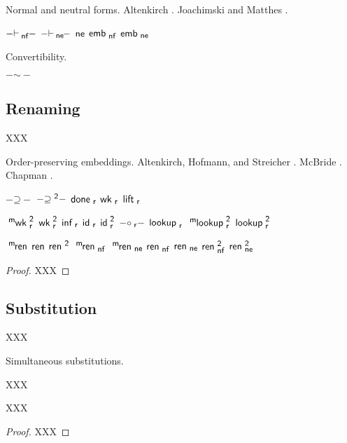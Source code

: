 \documentclass{entcs}
\renewcommand{\:}{\mathrel{:}}
\renewcommand{\;}{\mathbin{;}}
\newcommand{\binop}[1]{-\mathord{#1}-}
\newcommand{\tsf}[1]{\textsf{\upshape{#1}}}
\newcommand{\stsf}[1]{\tsf{\small{#1}}}
\newcommand{\enf}{\mathrel{\vdash_{\mkern-2mu\stsf{nf}}}}
\newcommand{\ene}{\mathrel{\vdash_{\mkern-2mu\rlap{$\stsf{ne}$}\hphantom{\stsf{nf}}}}}
\renewcommand{\ne}{\operatorname{\tsf{ne}}}
\newcommand{\embnf}{\operatorname{\tsf{emb}_{\stsf{nf}}}}
\newcommand{\embne}{\operatorname{\tsf{emb}_{\stsf{ne}}}}
\newcommand{\conv}{\mathrel{\sim}}
\renewcommand{\geq}{\mathrel{\supseteq}}
\newcommand{\geqZ}{\mathrel{\supseteq^{\stsf{2}}}}
\newcommand{\doner}{\operatorname{\tsf{done}_{\stsf{r}}}}
\newcommand{\wkr}{\operatorname{\tsf{wk}_{\stsf{r}}}}
\newcommand{\liftr}{\operatorname{\tsf{lift}_{\stsf{r}}}}
\newcommand{\mwkrZ}{\operatorname{^{\stsf{m}\mkern-1mu}\tsf{wk}_{\stsf{r}}^{\stsf{2}}}}
\newcommand{\wkrZ}{\operatorname{\tsf{wk}_{\stsf{r}}^{\stsf{2}}}}
\newcommand{\infr}{\operatorname{\tsf{inf}_{\stsf{r}}}}
\newcommand{\idr}{\operatorname{\tsf{id}_{\stsf{r}}}}
\newcommand{\idrZ}{\operatorname{\tsf{id}_{\stsf{r}}^{\stsf{2}}}}
\newcommand{\compr}{\mathrel{\circ_{\mkern-1mu\stsf{r}}}}
\newcommand{\lookupr}{\operatorname{\tsf{lookup}_{\stsf{r}}}}
\newcommand{\mlookuprZ}{\operatorname{^{\stsf{m}\mkern-1mu}\tsf{lookup}_{\stsf{r}}^{\stsf{2}}}}
\newcommand{\lookuprZ}{\operatorname{\tsf{lookup}_{\stsf{r}}^{\stsf{2}}}}
\newcommand{\mren}{\operatorname{^{\stsf{m}\mkern-2mu}\tsf{ren}}}
\newcommand{\ren}{\operatorname{\tsf{ren}}}
\newcommand{\renZ}{\operatorname{\tsf{ren}^{\stsf{2}}}}
\newcommand{\mrennf}{\operatorname{^{\stsf{m}\mkern-2mu}\tsf{ren}_{\stsf{nf}}}}
\newcommand{\mrenne}{\operatorname{^{\stsf{m}\mkern-2mu}\tsf{ren}_{\stsf{ne}}}}
\newcommand{\rennf}{\operatorname{\tsf{ren}_{\stsf{nf}}}}
\newcommand{\renne}{\operatorname{\tsf{ren}_{\stsf{ne}}}}
\newcommand{\rennfZ}{\operatorname{\tsf{ren}_{\stsf{nf}}^{\stsf{2}}}}
\newcommand{\renneZ}{\operatorname{\tsf{ren}_{\stsf{ne}}^{\stsf{2}}}}
\begin{document}
\begin{definition}
  Normal and neutral forms.  Altenkirch \cite{Altenkirch93}.  Joachimski and Matthes \cite{JoachimskiM03}.

$\binop{\enf}$ $\binop{\ene}$ $\ne$ $\embnf$ $\embne$
\end{definition}


\begin{definition}
  Convertibility.

$\binop{\conv}$
\end{definition}




\subsection*{Renaming}
XXX


\begin{definition}
  Order-preserving embeddings.  Altenkirch, Hofmann, and Streicher \cite{AltenkirchHS95}.  McBride \cite{McBride05}.  Chapman \cite{Chapman09}.

$\binop{\geq}$ $\binop{\geqZ}$ $\doner$ $\wkr$ $\liftr$
\end{definition}


$\mwkrZ$ $\wkrZ$ $\infr$ $\idr$ $\idrZ$ $\binop{\compr}$ $\lookupr$ $\mlookuprZ$ $\lookuprZ$


\begin{lemma}[Renaming]

$\mren$ $\ren$ $\renZ$ $\mrennf$ $\mrenne$ $\rennf$ $\renne$ $\rennfZ$ $\renneZ$
\begin{proof}
  XXX
\end{proof}
\end{lemma}




\subsection*{Substitution}
XXX


\begin{definition}
  Simultaneous substitutions.

XXX
\end{definition}


\begin{lemma}[Substitution]

XXX
\begin{proof}
  XXX
\end{proof}
\end{lemma}
\end{document}
